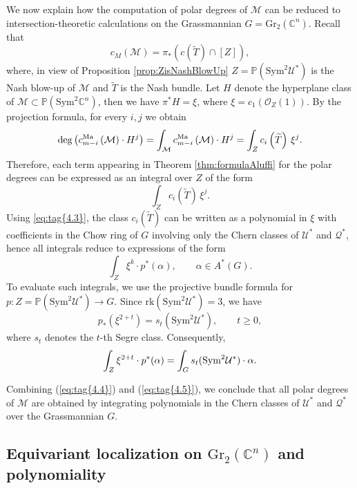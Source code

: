 \documentclass[11pt]{article}
\numberwithin{equation}{section}
\numberwithin{figure}{section}
\theoremstyle{plain}
\theoremstyle{definition}
\theoremstyle{remark}
\newcommand{\C}{\mathbb{C}}
\newcommand{\Gr}{\mathrm{Gr}}
\newcommand{\Sym}{\mathrm{Sym}}
\newcommand{\rk}{\mathrm{rk}}
\begin{document}
We now explain how the computation of polar degrees of $\mathcal M$
can be reduced to intersection-theoretic calculations on the Grassmannian
$G=\Gr _2 (\mathbb C^n)$. Recall that
\[
c_M\left(\mathcal M\right) = \pi_\ast \left( c\left(\widetilde T\right)\cap[Z] \right),
\]
where, in view of Proposition \ref{prop:ZisNashBlowUp} $Z=\mathbb P\left(\Sym^2\mathcal U^\ast\right)$ is the Nash blow-up of $\mathcal M$
and $\widetilde T$ is the Nash bundle. Let $H$ denote the hyperplane class of $\mathcal M\subset\mathbb P(\Sym^2\mathbb C^n)$, then we have $\pi^\ast H=\xi$, where $\xi=c_1(\mathcal O_Z(1))$.
By the projection formula, for every $i,j$ we obtain
\begin{equation}\label{eq:tag{4.4}}
\deg \left(
c^{\mathrm{Ma}}_{m-i}\left(\mathcal M\right)\cdot H^j
\right)
=
\int_{\mathcal M}
c^{\mathrm{Ma}}_{m-i}\left(\mathcal M\right)\cdot H^j
=
\int_Z
c_i\left(\widetilde T\right)\,\xi^j.
\end{equation}
Therefore, each term appearing in Theorem \ref{thm:formulaAluffi} for the polar degrees can be expressed as an integral over $Z$ of the form
\[
\int_Z c_i\left(\widetilde T\right)\,\xi^j.
\]
Using \ref{eq:tag{4.3}}, the class $c_i\left(\widetilde T\right)$ can be written as a polynomial
in $\xi$ with coefficients in the Chow ring of $G$ involving only
the Chern classes of $\mathcal U^\ast$ and $\mathcal Q^\ast$, hence all integrals reduce to expressions of the form
\[
\int_Z \xi^k \cdot p^\ast (\alpha),
\qquad
\alpha\in A^\ast (G).
\]
To evaluate such integrals, we use the projective bundle formula for
$p:Z=\mathbb P(\Sym^2\mathcal U^\ast)\to G$.
Since $\rk(\Sym^2\mathcal U^\ast)=3$, we have
\[
p_*(\xi^{2+t}) = s_t(\Sym^2\mathcal U^\ast),
\qquad t\ge 0,
\]
where $s_t$ denotes the $t$-th Segre class.
Consequently,
\begin{equation}\label{eq:tag{4.5}}
\int_Z \xi^{2+t}\cdot p^\ast (\alpha)
=
\int_G s_t(\Sym^2\mathcal U^\ast)\cdot \alpha.
\end{equation}

Combining (\ref{eq:tag{4.4}}) and (\ref{eq:tag{4.5}}), we conclude that all polar degrees of $\mathcal M$ are obtained by integrating polynomials in the Chern classes of $\mathcal U^\ast$ and $\mathcal Q^\ast$ over the Grassmannian $G$.

\subsection{Equivariant localization on $\Gr_2 \left(\C^n\right)$ and polynomiality}\label{sec:localization}
\end{document}
